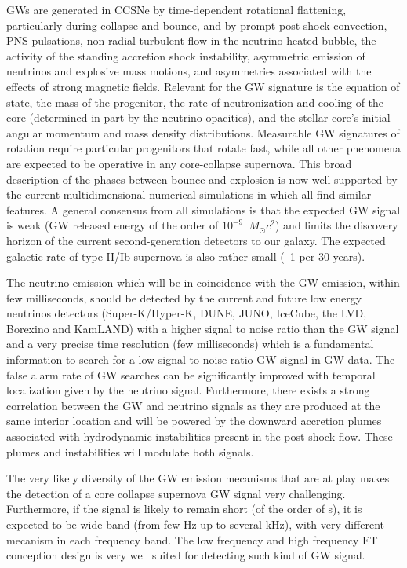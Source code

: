 GWs are generated in CCSNe by time-dependent rotational flattening, particularly during collapse and bounce, and by prompt post-shock convection, PNS pulsations, non-radial turbulent flow in the neutrino-heated bubble, the activity of the standing accretion shock instability, asymmetric emission of neutrinos and explosive mass motions, and asymmetries associated with the effects of strong magnetic fields. Relevant for the GW signature is the equation of state, the mass of the progenitor, the rate of neutronization and cooling of the core (determined in part by the neutrino opacities), and the stellar core’s initial angular momentum and mass density distributions. Measurable GW signatures of rotation require particular progenitors that rotate fast, while all other phenomena are expected to be operative in any core-collapse supernova. This broad description of the phases between bounce and explosion is now well supported by the current multidimensional numerical simulations in which all find similar features. A general consensus from all simulations is that the expected GW signal is weak (GW released energy of the order of $10^{-9}$~$M_\odot c^2$) and limits the discovery horizon of the current second-generation detectors to our galaxy. The expected galactic rate of type II/Ib supernova is also rather small (~1 per 30 years). 

The neutrino emission which will be in coincidence with the GW emission, within few milliseconds, should be detected by the current and future low energy neutrinos detectors (Super-K/Hyper-K, DUNE, JUNO, IceCube, the LVD, Borexino and KamLAND) with a higher signal to noise ratio than the GW signal and a very precise time resolution (few milliseconds) which is a fundamental information to search for a low signal to noise ratio GW signal in GW data. The false alarm rate of GW searches can be significantly improved with temporal localization given by the neutrino signal. Furthermore, there exists a strong correlation between the GW and neutrino signals as they are produced at the same interior location and will be powered by the downward accretion plumes associated with hydrodynamic instabilities present in the post-shock flow. These plumes and instabilities will modulate both signals.

The very likely diversity of the GW emission mecanisms that are at play makes the detection of a core collapse supernova GW signal very challenging. Furthermore, if the signal is likely to remain short (of the order of \unit[1]{s}), it is expected to be wide band (from few Hz up to several kHz), with very different mecanism in each frequency band. The low frequency and high frequency ET conception design is very well suited for detecting such kind of GW signal.


